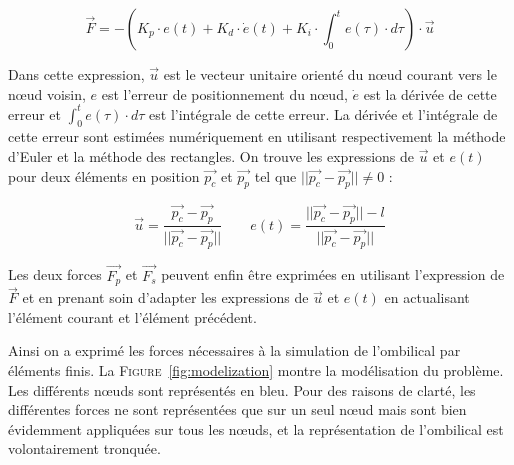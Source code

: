 \begin{description}
\begin{itemize}
						\begin{equation}
							\overrightarrow{F} = - \left(K_p \cdot e(t) + K_d \cdot \dot e(t) + K_i \cdot \int_{0}^te(\tau) \cdot d\tau \right) \cdot \overrightarrow{u}
							\label{eq:pid}
						\end{equation}
						
						Dans cette expression, $\overrightarrow{u}$ est le vecteur unitaire orienté du n\oe ud courant vers le n\oe ud voisin, $e$ est l'erreur de positionnement du n\oe ud, $\dot e$ est la dérivée de cette erreur et $\int_{0}^te(\tau) \cdot d\tau$ est l'intégrale de cette erreur. La dérivée et l'intégrale de cette erreur sont estimées numériquement en utilisant respectivement la méthode d'Euler et la méthode des rectangles. On trouve les expressions de $\overrightarrow{u}$ et $e(t)$ pour deux éléments en position $\overrightarrow{p_c}$ et $\overrightarrow{p_p}$ tel que $||\overrightarrow{p_c} - \overrightarrow{p_p}|| \neq 0$ :

						\begin{equation}
							\overrightarrow{u} = \frac{\overrightarrow{p_c} - \overrightarrow{p_p}}{||\overrightarrow{p_c} - \overrightarrow{p_p}||} \qquad e(t) = \frac{||\overrightarrow{p_c} - \overrightarrow{p_p}|| - l}{||\overrightarrow{p_c} - \overrightarrow{p_p}||}
							\label{eq:behavioral}
						\end{equation}
						
						Les deux forces $\overrightarrow{F_p}$ et $\overrightarrow{F_s}$ peuvent enfin être exprimées en utilisant l'expression de $\overrightarrow{F}$ et en prenant soin d'adapter les expressions de $\overrightarrow{u}$ et $e(t)$ en actualisant l'élément courant et l'élément précédent.
					\end{itemize}
				\end{description}
			
				Ainsi on a exprimé les forces nécessaires à la simulation de l'ombilical par éléments finis. La \textsc{Figure}~\ref{fig:modelization} montre la modélisation du problème. Les différents n\oe uds sont représentés en bleu. Pour des raisons de clarté, les différentes forces ne sont représentées que sur un seul n\oe ud mais sont bien évidemment appliquées sur tous les n\oe uds, et la représentation de l'ombilical est volontairement tronquée.
			
